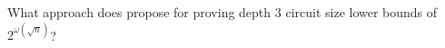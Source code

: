 \documentclass{article}
\begin{document}

    \thispagestyle{fancy}

    \begin{question}

        What approach does \cite{LRT2022} propose for proving depth 3 circuit size lower bounds of $2^{\omega\left(\sqrt{n}\right)}$?

    \end{question}



%
%

    \printbibliography
\end{document}
